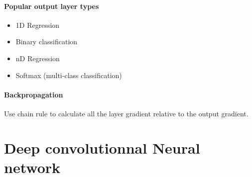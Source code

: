 		\paragraph*{Popular output layer types}
			\begin{itemize}
				\item 1D Regression
				\item Binary classification
				\item nD Regression
				\item Softmax (multi-class classification)
			\end{itemize}

		\paragraph*{Backpropagation}
			Use chain rule to calculate all the layer gradient relative to the output gradient.


\section{Deep convolutionnal Neural network}


